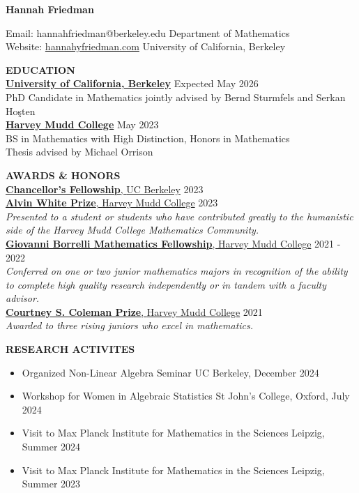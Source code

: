 \documentclass[11pt]{article}
\newcommand{\hdr}[1]{\textcolor{blue(ryb)}{\textbf{#1}}}
\newcommand{\role}[3]{\underline{\textbf{#1}, {#2}} \hfill #3}
\begin{document}
\begin{center}
\hdr{\Large{Hannah Friedman}}\\
\end{center}
Email: hannahfriedman@berkeley.edu \hfill Department of Mathematics\\
Website: \url{hannahyfriedman.com} \hfill University of California, Berkeley

\bigskip
\raggedright
\hdr{EDUCATION}\\
\textbf{\underline{University of California, Berkeley}} \hfill Expected May 2026\\
PhD Candidate in Mathematics jointly advised by Bernd Sturmfels and Serkan Ho\c{s}ten\\
\textbf{\underline{Harvey Mudd College}} \hfill May 2023\\
BS in Mathematics with High Distinction, Honors in Mathematics\\
Thesis advised by Michael Orrison

\bigskip

\hdr{AWARDS \& HONORS}\\
\role{Chancellor's Fellowship}{UC Berkeley}{2023}\\
\role{Alvin White Prize}{Harvey Mudd College}{2023}\\
\textit{Presented to a student or students who have contributed greatly to the humanistic side of the Harvey Mudd College Mathematics Community.}\\
\role{Giovanni Borrelli Mathematics Fellowship}{Harvey Mudd College}{2021 - 2022}\\
\textit{Conferred on one or two junior mathematics majors in recognition of the ability to complete high quality research independently or in tandem with a faculty advisor.}\\
\role{Courtney S. Coleman Prize}{Harvey Mudd College}{2021}\\
\textit{Awarded to three rising juniors who excel in mathematics.}

\bigskip

\hdr{RESEARCH ACTIVITES}\\
\begin{itemize}
  \item Organized Non-Linear Algebra Seminar \hfill UC Berkeley, December 2024
  \item Workshop for Women in Algebraic Statistics \hfill St John's College, Oxford, July 2024
  \item Visit to Max Planck Institute for Mathematics in the Sciences \hfill Leipzig, Summer 2024
  \item Visit to Max Planck Institute for Mathematics in the Sciences \hfill Leipzig, Summer 2023
\end{itemize}
\end{document}
